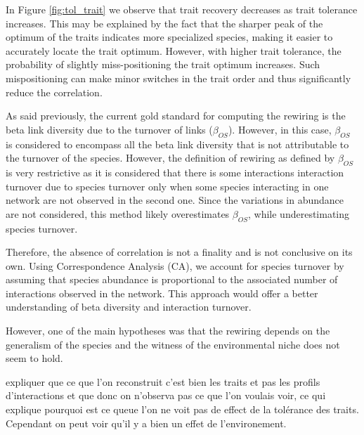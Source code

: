 In Figure \ref{fig:tol_trait} we observe that trait recovery decreases as trait tolerance increases.
This may be explained by the fact that the sharper peak of the optimum of the traits indicates more specialized species, making it easier to accurately locate the trait optimum. However, with higher trait tolerance, the probability of slightly miss-positioning the trait optimum increases. Such mispositioning can make minor switches in the trait order and thus significantly reduce the correlation.




As said previously, the current gold standard for computing the rewiring is the beta link diversity due to the turnover of links ($\beta_{OS}$). However, in this case, $\beta_{OS}$ is considered to encompass all the beta link diversity that is not attributable to the turnover of the species. However, the definition of rewiring as defined by $\beta_{OS}$ is very restrictive as it is considered that there is some interactions interaction turnover due to species turnover only when some species interacting in one network are not observed in the second one. Since the variations in abundance are not considered, this method likely overestimates $\beta_{OS}$, while underestimating species turnover.

Therefore, the absence of correlation is not a finality and is not conclusive on its own. Using Correspondence Analysis (CA), we account for species turnover by assuming that species abundance is proportional to the associated number of interactions observed in the network. This approach would offer a better understanding of beta diversity and interaction turnover.












However, one of the main hypotheses was that the rewiring depends on the generalism of the species and the witness of the environmental niche does not seem to hold.

expliquer que ce que l'on reconstruit c'est bien les traits et pas les profils d'interactions et que donc on n'observa pas ce que l'on voulais voir, ce qui explique pourquoi est ce queue l'on ne voit pas de effect de la tolérance des traits. Cependant on peut voir qu'il y a bien un effet de l'environement.




